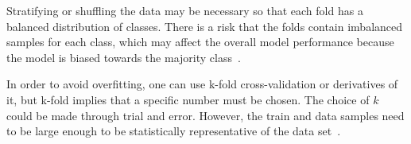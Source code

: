 Stratifying or shuffling the data may be necessary so that each fold has a balanced distribution of classes. There is a risk that the folds contain imbalanced samples for each class, which may affect the overall model performance because the model is biased towards the majority class~\cite{Refaeilzadeh2009}.

In order to avoid overfitting, one can use k-fold cross-validation or derivatives of it, but k-fold implies that a specific number must be chosen. The choice of $k$ could be made through trial and error. However, the train and data samples need to be large enough to be statistically representative of the data set~\cite{Refaeilzadeh2009}.

